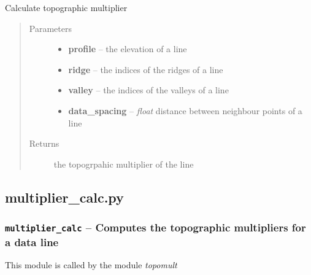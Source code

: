 \documentclass[letterpaper,10pt,english]{sphinxmanual}
\begin{document}
\begin{fulllineitems}
\label{docs/topographic:mh.mh_calc}
Calculate topographic multiplier
\begin{quote}\begin{description}
\item[{Parameters}] \leavevmode\begin{itemize}
\item {} 
\textbf{profile} --  the elevation of a line

\item {} 
\textbf{ridge} --  the indices of the ridges of a line

\item {} 
\textbf{valley} --  the indices of the valleys of a line

\item {} 
\textbf{data\_spacing} -- \emph{float} distance between neighbour points of a line

\end{itemize}

\item[{Returns}] \leavevmode
{} the topogrpahic multiplier of the line

\end{description}\end{quote}

\end{fulllineitems}



\subsection{multiplier\_calc.py}
\label{docs/topographic:multiplier-calc-py}\label{docs/topographic:module-multiplier_calc}

\subsubsection{\texttt{multiplier\_calc} -- Computes the topographic multipliers for a data line}
\label{docs/topographic:multiplier-calc-computes-the-topographic-multipliers-for-a-data-line}
This module is called by the module \emph{topomult}

\end{document}
